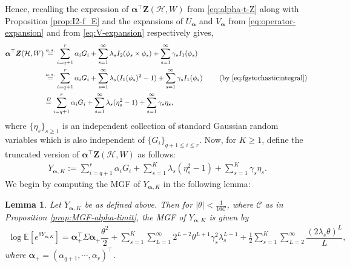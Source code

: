 \documentclass[11pt,reqno]{amsart}
\numberwithin{equation}{section}
\newtheorem{lemma}{Lemma}[section]
\theoremstyle{definition}
\begin{document}
Hence, recalling the expression of $\bm{\alpha}^{\top}\bm{Z}(\mathcal{H},W)$ from \eqref{eq:alpha-t-Z} along with Proposition \ref{prop:I2-f_E} and the expansions of $U_{\bm{\alpha}}$ and $V_{\bm{\alpha}}$ from \eqref{eq:operator-expansion} and from \eqref{eq:V-expansion} respectively gives, 
\begin{align*}
    \bm{\alpha}^{\top}\bm{Z}(\mathcal{H},W) & \stackrel{a.s.}= \sum_{i=q+1}^r \alpha_i G_i + \sum_{s=1}^\infty \lambda_s I_2(\phi_s \times \phi_s) + \sum_{s=1}^\infty \gamma_s I_1(\phi_s) \nonumber \\ 
   & \stackrel{a.s.} = \sum_{i=q+1}^r \alpha_i G_i + \sum_{s=1}^\infty \lambda_s ( I_1(\phi_s)^2 -1 ) + \sum_{s=1}^\infty \gamma_s I_1(\phi_s) \tag*{ (by \eqref{eq:fgstochasticintegral}) } \nonumber \\ 
& \stackrel{D} = \sum_{i=q+1}^{r}\alpha_{i}G_{i} + \sum_{s=1}^{\infty}\lambda_{s}(\eta_{s}^{2}-1) + \sum_{s=1}^{\infty} \gamma_s \eta_{s} , 
\end{align*} 
where $\{\eta_{s}\}_{s \geq 1}$ is an independent collection of standard Gaussian random variables which is also independent of $\{G_{i}\}_{q+1 \leq i \leq r}$. Now, for $K \geq 1$, define the truncated version of $ \bm{\alpha}^{\top}\bm{Z}(\mathcal{H},W)$ as follows: 
\begin{align}\label{eq:YMGF}
    Y_{\bm \alpha, K}:= \sum_{i=q+1}^{r}\alpha_{i}G_{i} + \sum_{s=1}^{K}\lambda_{s}(\eta_{s}^{2}-1) + \sum_{s=1}^{K} \gamma_s \eta_{s} . 
\end{align} 
We begin by computing the MGF of $ Y_{\bm \alpha, K}$ in the following lemma: 




\begin{lemma}\label{lemma:log-MGF-YN} 
Let $Y_{\bm \alpha, K}$ be as defined above. Then for $|\theta|< \frac{1}{16\mathcal{C}}$, where $\mathcal C$ as in Proposition \ref{prop:MGF-alpha-limit}, the MGF of $Y_{\bm \alpha, K}$ is given by 
\begin{align*}
    \log\mathbb{E}\left[ e^{\theta Y_{\bm \alpha, K}} \right] = \bm{\alpha}_{+}^{\top}\Sigma\bm{\alpha}_{+}\dfrac{\theta^{2}}{2} + \sum_{s=1}^{K}\sum_{L = 1}^{\infty}2^{L-2}\theta^{L+1}\gamma_{s}^{2}\lambda_{s}^{L-1} + \frac{1}{2}\sum_{s=1}^{K}\sum_{L=2}^{\infty}\dfrac{\left(2\lambda_{s}\theta\right)^{L}}{L} , 
\end{align*}
where $\bm{\alpha}_+ = (\alpha_{q+1},\cdots,\alpha_{r})^{\top}$. 
\end{lemma}
\end{document}
